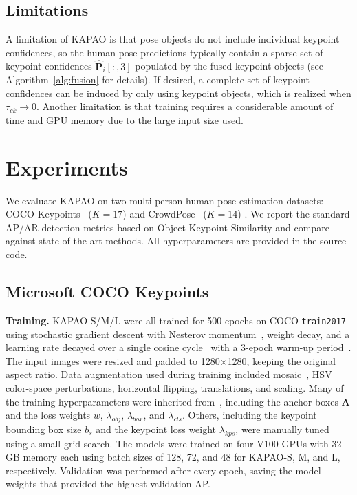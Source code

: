 \documentclass[runningheads]{llncs}
\newcommand\hlll[1]{\bgroup
  \hskip0pt\color{black}#1\egroup
}
\begin{document}
\subsection{Limitations}
\label{sec:kapao_limitations}
A limitation of KAPAO is that pose objects do not include individual keypoint confidences, so the human pose predictions typically contain a sparse set of keypoint confidences $\hat{\mathbf{P}}_i[:,3]$ populated by the fused keypoint objects (see Algorithm~\ref{alg:fusion} for details). If desired, a complete set of keypoint confidences can be induced by only using keypoint objects, which is realized when $\tau_{ck} \rightarrow 0$. Another limitation is that training requires a considerable amount of time and GPU memory due to the large input size used. 

\section{Experiments}
\label{sec:kapao_exp}
We evaluate KAPAO on two multi-person human pose estimation datasets: COCO Keypoints~\cite{lin2014microsoft} \hlll{($K=17$)} and CrowdPose~\cite{li2019crowdpose} \hlll{($K=14$)}. We report the standard AP/AR detection metrics based on Object Keypoint Similarity \cite{lin2014microsoft} and compare against state-of-the-art methods.
All hyperparameters are provided in the source code.

\subsection{Microsoft COCO Keypoints}
\medskip\noindent\textbf{Training.} KAPAO-S/M/L were all trained for 500 epochs on COCO \texttt{train2017} using stochastic gradient descent with Nesterov momentum~\cite{Nesterov1983AMF}, weight decay, and a learning rate decayed over a single cosine cycle~\cite{loshchilov2016sgdr} with a 3-epoch warm-up period~\cite{goyal2017accurate}. The input images were resized and padded to 1280$\times$1280, keeping the original aspect ratio. Data augmentation used during training included mosaic~\cite{bochkovskiy2020yolov4}, HSV color-space perturbations, horizontal flipping, translations, and scaling. Many of the training hyperparameters were inherited from~\cite{wang2020scaled, glenn_jocher_2021_4679653}, including the anchor boxes $\mathbf{A}$ and the loss weights $w$, $\lambda_{obj}$, $\lambda_{box}$, and $\lambda_{cls}$. Others, including the keypoint bounding box size $b_s$ and the keypoint loss weight $\lambda_{kps}$, were manually tuned using a small grid search. The models were trained on four V100 GPUs with 32 GB memory each using batch sizes of 128, 72, and 48 for KAPAO-S, M, and L, respectively. Validation was performed after every epoch, saving the model weights that provided the highest validation AP.
\end{document}
